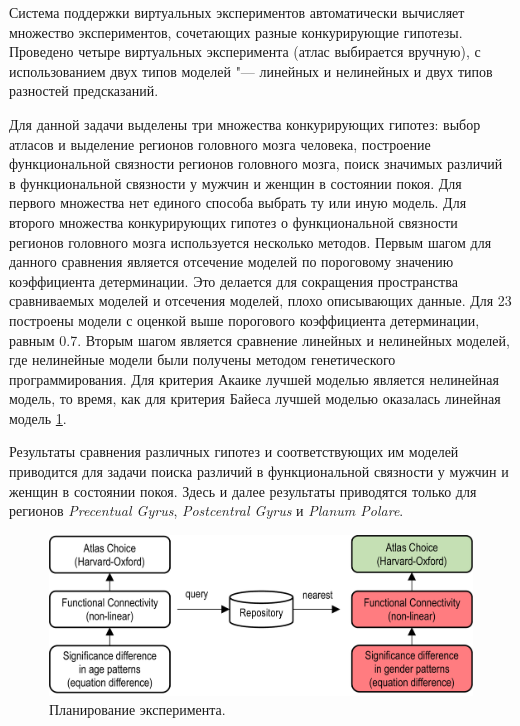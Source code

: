 Система поддержки виртуальных экспериментов автоматически вычисляет множество экспериментов, сочетающих разные 
конкурирующие гипотезы. Проведено четыре виртуальных эксперимента (атлас выбирается вручную), с использованием 
двух типов моделей "--- линейных и нелинейных и двух типов разностей предсказаний.

Для данной задачи выделены три множества конкурирующих гипотез: выбор атласов и выделение регионов головного 
мозга человека, построение функциональной связности регионов головного мозга, поиск значимых различий в 
функциональной связности у мужчин и женщин в состоянии покоя. Для первого множества нет единого способа выбрать 
ту или иную модель. Для второго множества конкурирующих гипотез о функциональной связности регионов 
головного мозга используется несколько 
методов. Первым шагом для данного сравнения является отсечение моделей по пороговому значению коэффициента 
детерминации. Это делается для сокращения пространства сравниваемых моделей и отсечения моделей, плохо описывающих 
данные. Для 23 построены модели с оценкой 
выше порогового коэффициента детерминации, равным 0.7. Вторым шагом является сравнение линейных и нелинейных 
моделей, где нелинейные модели были получены методом генетического программирования. 
Для критерия Акаике лучшей моделью является нелинейная модель, то время, как для 
критерия Байеса лучшей моделью оказалась линейная модель \cref{fig:planning}.

Результаты сравнения различных гипотез и соответствующих им моделей приводится для задачи поиска различий в 
функциональной связности у мужчин и женщин в состоянии покоя. Здесь 
и далее результаты приводятся только для регионов \textit{Precentual Gyrus}, \textit{Postcentral Gyrus} 
и \textit{Planum Polare}. 

\begin{figure}[ht]
    \centering
    \includegraphics[width=1.0\linewidth]{images/planning.pdf}
    \caption{Планирование эксперимента.}\label{fig:planning}
\end{figure}



